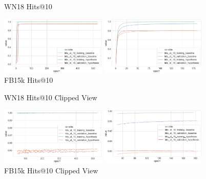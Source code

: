 \begin{figure}[H]
	\parbox{.5\linewidth}{
   		\caption{WN18 Hits@10}
   		\centering
    		\includegraphics[width=0.45\textwidth, height=0.2\textheight]{WN18_hits_at_10_Results}
		}
	\hfill
	\parbox{.5\linewidth}{
		\caption{FB15k Hits@10}
   		\centering
		\includegraphics[width=0.45\textwidth, height=0.2\textheight]{FB15k_hits_at_10_Results}
		}
\end{figure}

\begin{figure}[H]
	\parbox{.5\linewidth}{
   		\caption{WN18 Hits@10 Clipped View}
   		\centering
    		\includegraphics[width=0.45\textwidth, height=0.2\textheight]{WN18_hits_at_10_Results_Clipped}
		}
	\hfill
	\parbox{.5\linewidth}{
		\caption{FB15k Hits@10  Clipped View}
   		\centering
		\includegraphics[width=0.45\textwidth, height=0.2\textheight]{FB15k_hits_at_10_Results_Clipped}
		}
\end{figure}



